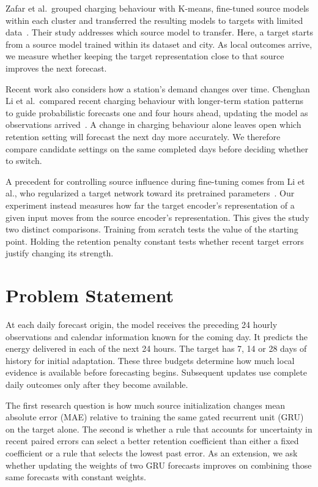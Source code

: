 Zafar et al.\ grouped charging behaviour with K-means, fine-tuned source models within each cluster and transferred the resulting models to targets with limited data~\cite{zafar2025}. Their study addresses which source model to transfer. Here, a target starts from a source model trained within its dataset and city. As local outcomes arrive, we measure whether keeping the target representation close to that source improves the next forecast.

Recent work also considers how a station's demand changes over time. Chenghan Li et al.\ compared recent charging behaviour with longer-term station patterns to guide probabilistic forecasts one and four hours ahead, updating the model as observations arrived~\cite{li2026behavior}. A change in charging behaviour alone leaves open which retention setting will forecast the next day more accurately. We therefore compare candidate settings on the same completed days before deciding whether to switch.

A precedent for controlling source influence during fine-tuning comes from Li et al., who regularized a target network toward its pretrained parameters~\cite{li2018}. Our experiment instead measures how far the target encoder's representation of a given input moves from the source encoder's representation. This gives the study two distinct comparisons. Training from scratch tests the value of the starting point. Holding the retention penalty constant tests whether recent target errors justify changing its strength.

\section{Problem Statement}

At each daily forecast origin, the model receives the preceding 24 hourly observations and calendar information known for the coming day. It predicts the energy delivered in each of the next 24 hours. The target has 7, 14 or 28 days of history for initial adaptation. These three budgets determine how much local evidence is available before forecasting begins. Subsequent updates use complete daily outcomes only after they become available.

The first research question is how much source initialization changes mean absolute error (MAE) relative to training the same gated recurrent unit (GRU) on the target alone. The second is whether a rule that accounts for uncertainty in recent paired errors can select a better retention coefficient than either a fixed coefficient or a rule that selects the lowest past error. As an extension, we ask whether updating the weights of two GRU forecasts improves on combining those same forecasts with constant weights.

